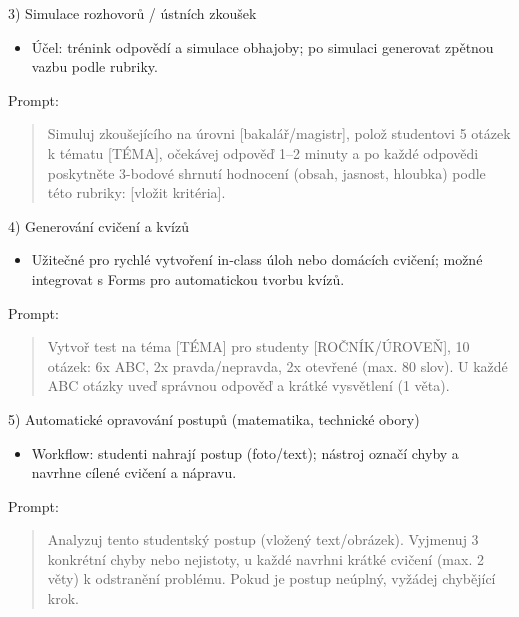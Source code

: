 3) Simulace rozhovorů / ústních zkoušek
\begin{itemize}
  \item Účel: trénink odpovědí a simulace obhajoby; po simulaci generovat zpětnou vazbu podle rubriky.
\end{itemize}
Prompt:
\begin{quote}
\begin{PromptBlock}

Simuluj zkoušejícího na úrovni [bakalář/magistr], polož studentovi 5 otázek k tématu [TÉMA], očekávej odpověď 1–2 minuty a po každé odpovědi poskytněte 3-bodové shrnutí hodnocení (obsah, jasnost, hloubka) podle této rubriky: [vložit kritéria].
\end{PromptBlock}

\end{quote}

4) Generování cvičení a kvízů
\begin{itemize}
  \item Užitečné pro rychlé vytvoření in‑class úloh nebo domácích cvičení; možné integrovat s Forms pro automatickou tvorbu kvízů. \cite{kb_ai_101_tipu_pdf_04e4a115_page_36_1}
\end{itemize}
Prompt:
\begin{quote}
\begin{PromptBlock}

Vytvoř test na téma [TÉMA] pro studenty [ROČNÍK/ÚROVEŇ], 10 otázek: 6x ABC, 2x pravda/nepravda, 2x otevřené (max. 80 slov). U každé ABC otázky uveď správnou odpověď a krátké vysvětlení (1 věta).
\end{PromptBlock}

\end{quote}

5) Automatické opravování postupů (matematika, technické obory)
\begin{itemize}
  \item Workflow: studenti nahrají postup (foto/text); nástroj označí chyby a navrhne cílené cvičení a nápravu. \cite{kb_ai_101_tipu_pdf_04e4a115_page_8_1}
\end{itemize}
Prompt:
\begin{quote}
\begin{PromptBlock}

Analyzuj tento studentský postup (vložený text/obrázek). Vyjmenuj 3 konkrétní chyby nebo nejistoty, u každé navrhni krátké cvičení (max. 2 věty) k odstranění problému. Pokud je postup neúplný, vyžádej chybějící krok.
\end{PromptBlock}

\end{quote}

